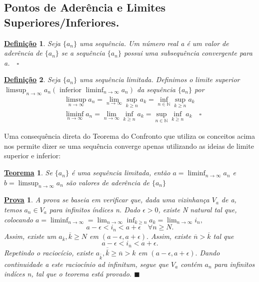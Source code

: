 \documentclass{article}
\newtheorem*{def*}{\underline{Defini\c c\~ao}}
\newtheorem*{theorem*}{\underline{Teorema}}
\newtheorem*{proof*}{\underline{Prova}}
\renewcommand\qedsymbol{$\blacksquare$}
\begin{document}
\subsection{Pontos de Ader\^encia e Limites Superiores/Inferiores.}
\begin{def*}
   Seja $\{a_{n}\} $ uma sequ\^encia. Um n\'umero real a \'e um valor de ader\^encia de $\{a_{n}\} $ se a sequ\^encia $\{a_{n}\}$ possui
uma subsequ\^encia convergente para a.$\quad\square$
\end{def*}
\begin{def*}
  Seja $\{a_{n}\} $  uma sequ\^encia limitada. Definimos o limite superior $\displaystyle\limsup_{n\to\infty}a_{n}(\text{ inferior }\liminf_{n\to\infty}a_{n})$ da 
sequ\^encia $\{a_{n}\} $ por 
  \begin{align*}
    &\limsup_{n\to\infty}a_{n} = \lim_{n\to\infty}\sup_{k\geq{n}}a_{k} = \inf_{n\in \mathbb{N}}\sup_{k\geq{n}}a_{k}\\
    &\liminf_{n\to\infty}a_{n} = \lim_{n\to\infty}\inf_{k\geq{n}}a_{k} = \sup_{n\in \mathbb{N}}\inf_{k\geq{n}}a_{k}\quad\square
  \end{align*}
\end{def*}
  Uma consequ\^encia direta do Teorema do Confronto que utiliza os conceitos acima nos permite dizer se uma sequ\^encia converge apenas
utilizando as ideias de limite superior e inferior:
 \begin{theorem*}
   Se $\{a_{n}\} $ \'e uma sequ\^encia limitada, ent\~ao $a = \liminf_{n\to\infty}a_{n}$ e $b = \limsup_{n\to\infty}a_{n}$
   s\~ao valores de ader\^encia de $\{a_{n}\} $
 \end{theorem*}
\begin{proof*}
  A prova se baseia em verificar que, dada uma vizinhan\c ca $V_{a}$ de a, temos $a_{n}\in V_{a}$ para infinitos \'indices n. 
Dado $\epsilon > 0$, existe N natural tal que, colocando $a =\displaystyle \liminf_{n\to\infty} = \lim_{n\to\infty}\inf_{k\geq{n}}a_{k} = \lim_{n\to\infty}i_{n},$
  $$
    a - \epsilon < i_{n} < a + \epsilon \quad \forall n \geq{N}.
  $$
  Assim, existe um $a_{\overline{k}}, \overline{k}\geq{N}$ em $(a-\epsilon, a+\epsilon).$ Assim, existe $\overline{n} > \overline{k}$ tal que 
    $$
      a - \epsilon < i_{\overline{n}} < a + \epsilon.
    $$
    Repetindo o racioc\'icio, existe $a_{\overline{\overline{k}}}, \overline{\overline{k}} \geq{\overline{n}} > k$ em $(a - \epsilon, a + \epsilon).$
  Dando continuidade a este racioc\'inio ad infinitum, segue que $V_{a}$ cont\'em $a_{n}$ para infinitos ind\'ices n, tal que o teorema est\'a provado. \qedsymbol
\end{proof*}
\end{document}

